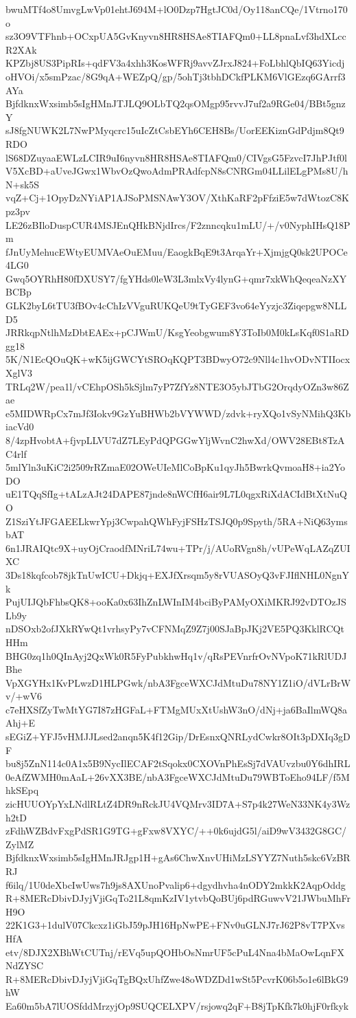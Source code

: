 bwuMTf4o8UmvgLwVp01ehtJ694M+lO0Dzp7HgtJC0d/Oy118anCQe/1Vtrno170o
sz3O9VTFhnb+OCxpUA5GvKnyvn8HR8HSAe8TIAFQm0+LL8pnaLvf3hdXLccR2XAk
KPZbj8US3PipRIs+qdFV3a4xhh3KosWFRj9avvZJrxJ824+FoLbhlQbIQ63Yicdj
oHVOi/x5smPzac/8G9qA+WEZpQ/gp/5ohTj3tbhDCkfPLKM6VlGEzq6GArrf3AYa
BjfdknxWxsimb5sIgHMnJTJLQ9OLbTQ2qsOMgp95rvvJ7uf2a9RGe04/BBt5gnzY
sJ8fgNUWK2L7NwPMyqcrc15uIcZtCsbEYh6CEH8Bs/UorEEKiznGdPdjm8Qt9RDO
lS68DZuyaaEWLzLCIR9uI6nyvn8HR8HSAe8TIAFQm0/CIVgsG5FzvcI7JhPJtf0l
V5XcBD+aUveJGwx1WbvOzQwoAdmPRAdfcpN8sCNRGm04LLilELgPMs8U/hN+sk5S
vqZ+Cj+1OpyDzNYiAP1AJSoPMSNAwY3OV/XthKaRF2pFfziE5w7dWtozC8Kpz3pv
LE26zBIloDuspCUR4MSJEnQHkBNjdIrcs/F2znncqku1mLU/+/v0NyphIHsQ18Pm
fJnUyMehucEWtyEUMVAeOuEMuu/EaogkBqE9t3ArqaYr+XjmjgQ0sk2UPOCe4LG0
Gwq5OYRhH80fDXUSY7/fgYHds0leW3L3mlxVy4lynG+qmr7xkWhQeqeaNzXYBCBp
GLK2byL6tTU3fBOv4cChIzVVguRUKQeU9tTyGEF3vo64eYyzjc3Ziqepgw8NLLD5
JRRkqpNtlhMzDbtEAEx+pCJWmU/KsgYeobgwum8Y3ToIb0M0kLsKqf0S1aRDgg18
5K/N1EcQOuQK+wK5ijGWCYtSROqKQPT3BDwyO72c9Nll4c1hvODvNTIIocxXglV3
TRLq2W/pea1l/vCEhpOSh5kSjlm7yP7ZfYz8NTE3O5ybJTbG2OrqdyOZn3w86Zae
e5MIDWRpCx7mJf3Iokv9GzYuBHWb2bVYWWD/zdvk+ryXQo1vSyNMihQ3KbiacVd0
8/4zpHvobtA+fjvpLLVU7dZ7LEyPdQPGGwYljWvnC2hwXd/OWV28EBt8TzAC4rlf
5mlYln3uKiC2i2509rRZmaE02OWeUIeMlCoBpKu1qyJh5BwrkQvmoaH8+ia2YoDO
uE1TQqSfIg+tALzAJt24DAPE87jnde8nWCfH6air9L7L0qgxRiXdACIdBtXtNuQO
Z1SziYtJFGAEELkwrYpj3CwpahQWhFyjFSHzTSJQ0p9Spyth/5RA+NiQ63ymsbAT
6n1JRAIQtc9X+uyOjCraodfMNriL74wu+TPr/j/AUoRVgn8h/vUPeWqLAZqZUIXC
3Ds18kqfcob78jkTnUwICU+Dkjq+EXJfXrsqm5y8rVUASOyQ3vFJIflNHL0NgnYk
PujUIJQbFhbsQK8+ooKa0x63IhZnLWInIM4bciByPAMyOXiMKRJ92vDTOzJSLb9y
nDSOxb2ofJXkRYwQt1vrhsyPy7vCFNMqZ9Z7j00SJaBpJKj2VE5PQ3KklRCQtHHm
BHG0zq1h0QInAyj2QxWk0R5FyPubkhwHq1v/qRsPEVnrfrOvNVpoK71kRlUDJBhe
VpXGYHx1KvPLwzD1HLPGwk/nbA3FgceWXCJdMtuDu78NY1Z1iO/dVLrBrWv/+wV6
c7eHXSfZyTwMtYG7I87zHGFaL+FTMgMUxXtUshW3nO/dNj+ja6BaIlmWQ8aAhj+E
sEGiZ+YFJ5vHMJJLsed2anqn5K4f12Gip/DrEsnxQNRLydCwkr8OIt3pDXIq3gDF
bu8j5ZnN114c0A1x5B9NycIlECAF2tSqokx0CXOVnPhEsSj7dVAUvzbu0Y6dhIRL
0eAfZWMH0mAaL+26vXX3BE/nbA3FgceWXCJdMtuDu79WBToEho94LF/f5MhkSEpq
zicHUUOYpYxLNdlRLtZ4DR9nRckJU4VQMrv3ID7A+S7p4k27WeN33NK4y3Wzh2tD
zFdhWZBdvFxgPdSR1G9TG+gFxw8VXYC/++0k6ujdG5l/aiD9wV3432G8GC/ZylMZ
BjfdknxWxsimb5sIgHMnJRJgp1H+gAs6ChwXnvUHiMzLSYYZ7Nuth5skc6VzBRRJ
f6ilq/1U0deXbcIwUws7h9js8AXUnoPvalip6+dgydhvha4nODY2mkkK2AqpOddg
R+8MERcDbivDJyjVjiGqTo21L8qmKzIV1ytvbQoBUj6pdRGuwvV21JWbuMhFrH9O
22K1G3+1dulV07Ckcxz1iGbJ59pJH16HpNwPE+FNv0uGLNJ7rJ62P8vT7PXvsHfA
etv/8DJX2XBhWtCUTnj/rEVq5upQOHbOsNmrUF5cPuL4Nna4bMaOwLqnFXNdZYSC
R+8MERcDbivDJyjVjiGqTgBQxUhfZwe48oWDZDd1wSt5PcvrK06b5o1e6lBkG9hW
Ea60m5bA7lUOSfddMrzyjOp9SUQCELXPV/rsjowq2qF+B8jTpKfk7k0hjF0rfkyk
